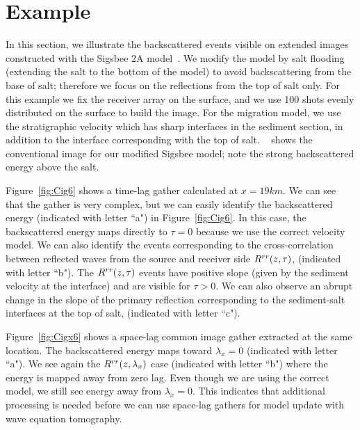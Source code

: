 

\section{Example}

In this section, we illustrate the backscattered events visible on extended images constructed with the Sigsbee 2A model~\citep{Sigsbee}. 
We modify the model by salt flooding (extending the salt to the bottom
of the model) to avoid backscattering from the base 
of salt; therefore we focus on the reflections from the top of salt only. For this example we fix the receiver array on 
the surface, and we use 100 shots evenly distributed on the surface to build 
the image. For the migration model, we use the stratigraphic
velocity which has sharp interfaces in the sediment section, in addition to the interface corresponding with the top of salt. 
~ shows the conventional image for our modified Sigsbee model; note the strong backscattered
energy above the salt.

Figure~\ref{fig:Cig6} shows a time-lag gather calculated at $x=19km$.
We can see that the gather is very complex, but we can easily identify the backscattered energy (indicated with letter ``a") in Figure~\ref{fig:Cig6}.
 In this case, the backscattered energy maps directly to $\tau=0$ because we use the correct velocity model.
We can also identify the events corresponding to the cross-correlation between reflected waves from the source and receiver side $R^{rr}(z,\tau)$, (indicated
with letter ``b"). The $R^{rr}(z,\tau)$ events have positive slope (given by the sediment velocity at the interface) and are 
visible for $\tau>0$. We can also observe an abrupt change
in the slope of the primary reflection corresponding to the sediment-salt interfaces at the top of salt, (indicated with letter ``c").

Figure~\ref{fig:Cigx6} shows a space-lag common image gather extracted at the same location. The backscattered energy maps toward $\lambda_x=0$ (indicated with 
letter ``a"). We see again the $R^{rr}(z,\lambda_x)$ case (indicated with letter ``b") where the energy is mapped away from zero lag.  
Even though we are using the correct model, we still see energy away from $\lambda_x=0$. This indicates that additional processing is needed before 
we can use space-lag gathers for model update with wave equation tomography.

